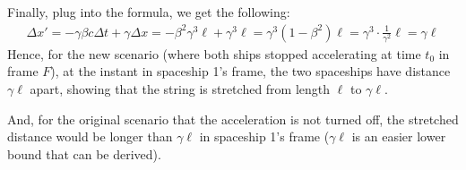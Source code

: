 \documentclass{article}
\begin{document}
Finally, plug into the formula, we get the following: 
\begin{align}
    \Delta x' = -\gamma\beta c\Delta t + \gamma\Delta x  = -\beta^2\gamma^3\ell + \gamma^3\ell = \gamma^3(1-\beta^2)\ell = \gamma^3\cdot\frac{1}{\gamma^2}\ell = \gamma\ell
\end{align}
Hence, for the new scenario (where both ships stopped accelerating at time $t_0$ in frame $F$), at the instant in spaceship 1's frame, the two spaceships have distance $\gamma\ell$ apart, showing that the string is stretched from length $\ell$ to $\gamma\ell$. 

And, for the original scenario that the acceleration is not turned off, the stretched distance would be longer than $\gamma\ell$ in spaceship 1's frame ($\gamma\ell$ is an easier lower bound that can be derived).
\end{document}
